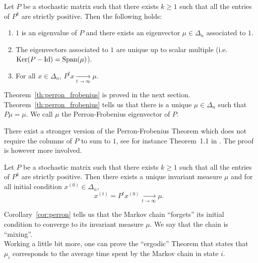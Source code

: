 \documentclass[11pt,nocut]{article}
\begin{document}


\begin{theorem}\label{th:perron_frobenius}
	Let $P$ be a stochastic matrix such that there exists $k \geq 1$ such that all the entries of $P^k$ are strictly positive. Then the following holds:
	\begin{enumerate}[label=(\roman*),noitemsep]
		\item\label{item:i} $1$ is an eigenvalue of $P$ and there exists an eigenvector $\mu \in \Delta_n$ associated to $1$.
		\item\label{item:ii} The eigenvectors associated to $1$ are unique up to scalar multiple (i.e.\ ${{\rm Ker}}(P-{{\rm Id}}) = {{\rm Span}}(\mu)$).
		\item\label{item:iii} For all $x \in \Delta_n$, $P^t x \xrightarrow[t \to \infty]{} \mu$.
	\end{enumerate}
\end{theorem}

Theorem~\ref{th:perron_frobenius} is proved in the next section.
Theorem~\ref{th:perron_frobenius} tells us that there is a unique $\mu \in \Delta_n$ such that $P \mu = \mu$. We call $\mu$ the Perron-Frobenius eigenvector of $P$.

\begin{remark}
	There exist a stronger version of the Perron-Frobenius Theorem which does not require the columns of $P$ to sum to $1$, see for instance Theorem~1.1 in \cite{seneta2006non}. The proof is however more involved.
\end{remark}

\begin{corollary}\label{cor:perron}
	Let $P$ be a stochastic matrix such that there exists $k \geq 1$ such that all the entries of $P^k$ are strictly positive. Then there exists a unique invariant measure $\mu$ and for all initial condition $x^{(0)} \in \Delta_n$,
	$$
	x^{(t)} = P^t x^{(0)} \xrightarrow[t \to \infty]{} \mu.
	$$
\end{corollary}

Corollary~\ref{cor:perron} tells us that the Markov chain ``forgets'' its initial condition to converge to its invariant measure $\mu$. We say that the chain is ``mixing''. 
\\

Working a little bit more, one can prove the ``ergodic'' Theorem that states that $\mu_i$ corresponds to the average time spent by the Markov chain in state $i$.
\end{document}
